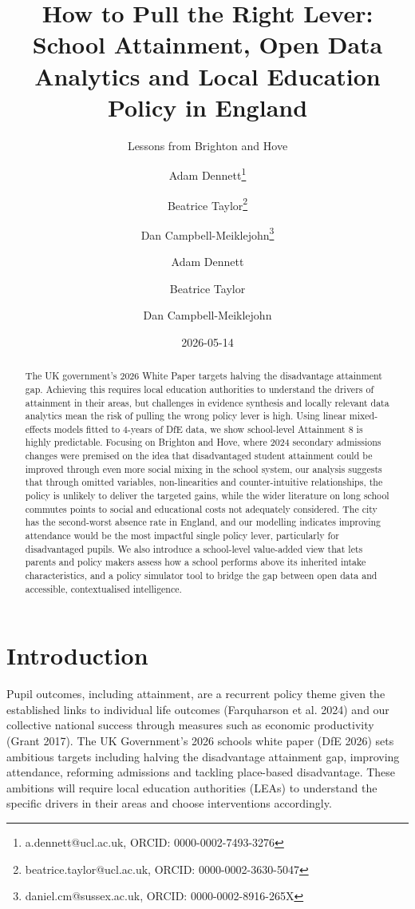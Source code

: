 \documentclass[
  12pt,
  titlepage]{article}
\author[1]{Adam Dennett\thanks{a.dennett@ucl.ac.uk, ORCID: 0000-0002-7493-3276}}
\author[1]{Beatrice Taylor\thanks{beatrice.taylor@ucl.ac.uk, ORCID: 0000-0002-3630-5047}}
\author[3]{Dan Campbell-Meiklejohn\thanks{daniel.cm@sussex.ac.uk, ORCID: 0000-0002-8916-265X}}
\affil[1]{Bartlett Centre for Advanced Spatial Analysis, University College London}
\affil[3]{School of Psychology, University of Sussex}
\title{How to Pull the Right Lever: School Attainment, Open Data
Analytics and Local Education Policy in England}
\subtitle{Lessons from Brighton and Hove}
\author{Adam Dennett \and Beatrice Taylor \and Dan Campbell-Meiklejohn}
\date{2026-05-14}
\begin{document}
\maketitle
\begin{abstract}
The UK government's 2026 White Paper targets halving the disadvantage
attainment gap. Achieving this requires local education authorities to
understand the drivers of attainment in their areas, but challenges in
evidence synthesis and locally relevant data analytics mean the risk of
pulling the wrong policy lever is high. Using linear mixed-effects
models fitted to 4-years of DfE data, we show school-level Attainment 8
is highly predictable. Focusing on Brighton and Hove, where 2024
secondary admissions changes were premised on the idea that
disadvantaged student attainment could be improved through even more
social mixing in the school system, our analysis suggests that through
omitted variables, non-linearities and counter-intuitive relationships,
the policy is unlikely to deliver the targeted gains, while the wider
literature on long school commutes points to social and educational
costs not adequately considered. The city has the second-worst absence
rate in England, and our modelling indicates improving attendance would
be the most impactful single policy lever, particularly for
disadvantaged pupils. We also introduce a school-level value-added view
that lets parents and policy makers assess how a school performs above
its inherited intake characteristics, and a policy simulator tool to
bridge the gap between open data and accessible, contextualised
intelligence.
\end{abstract}


\section{Introduction}\label{introduction}

Pupil outcomes, including attainment, are a recurrent policy theme given
the established links to individual life outcomes (Farquharson et al.
2024) and our collective national success through measures such as
economic productivity (Grant 2017). The UK Government's 2026 schools
white paper (DfE 2026) sets ambitious targets including halving the
disadvantage attainment gap, improving attendance, reforming admissions
and tackling place-based disadvantage. These ambitions will require
local education authorities (LEAs) to understand the specific drivers in
their areas and choose interventions accordingly.
\end{document}
